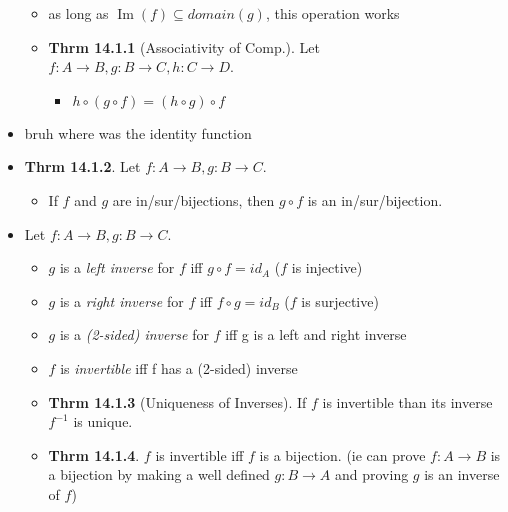 \documentclass[11pt]{article}
\theoremstyle{definition}
\DeclareMathOperator{\Img}{Im}
\begin{document}
\begin{itemize}
\begin{itemize}
        \item as long as $\Img(f) \subseteq domain(g)$, this operation works
        \item \textbf{Thrm 14.1.1} (Associativity of Comp.). Let $f:A\rightarrow B, g:B\rightarrow C, h:C\rightarrow D$.
        \begin{itemize}
            \item $h\circ (g\circ f) = (h \circ g) \circ f$
        \end{itemize}
    \end{itemize}
    \item bruh where was the identity function
    \item \textbf{Thrm 14.1.2}. Let $f:A\rightarrow B, g:B\rightarrow C$.
    \begin{itemize}
        \item If $f$ and $g$ are in/sur/bijections, then $g \circ f$ is an in/sur/bijection.
    \end{itemize}
    \item Let $f: A\rightarrow B, g:B\rightarrow C$.
    \begin{itemize}
        \item $g$ is a \emph{left inverse} for $f$ iff $g\circ f = id_A$ ($f$ is injective)
        \item $g$ is a \emph{right inverse} for $f$ iff $f \circ g = id_B$ ($f$ is surjective)
        \item $g$ is a \emph{(2-sided) inverse} for $f$ iff g is a left and right inverse
        \item $f$ is \emph{invertible} iff f has a (2-sided) inverse
        \item \textbf{Thrm 14.1.3} (Uniqueness of Inverses). If $f$ is invertible than its inverse $f^{-1}$ is unique.
        \item \textbf{Thrm 14.1.4}. $f$ is invertible iff $f$ is a bijection. (ie can prove $f:A\rightarrow B$ is a bijection by making a well defined $g:B\rightarrow A$ and proving $g$ is an inverse of $f$)
    \end{itemize}
\end{itemize}
\end{document}
